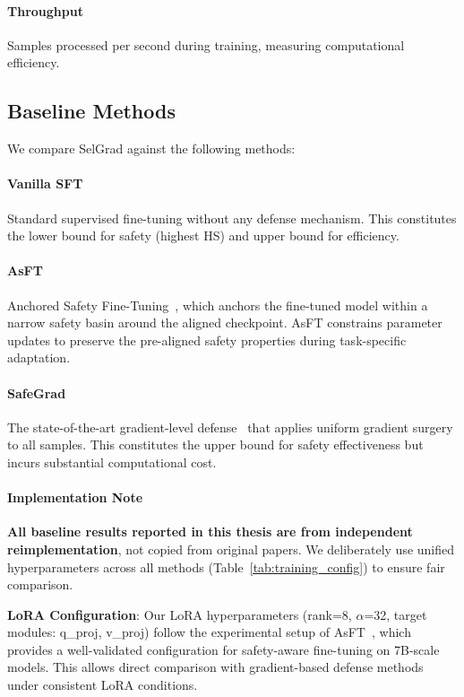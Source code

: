 \paragraph{Throughput}
Samples processed per second during training, measuring computational efficiency.

\subsection{Baseline Methods}
\label{subsec:baselines}

We compare SelGrad against the following methods:

\paragraph{Vanilla SFT}
Standard supervised fine-tuning without any defense mechanism. This constitutes the lower bound for safety (highest HS) and upper bound for efficiency.

\paragraph{AsFT}
Anchored Safety Fine-Tuning~\cite{huang2024asft}, which anchors the fine-tuned model within a narrow safety basin around the aligned checkpoint. AsFT constrains parameter updates to preserve the pre-aligned safety properties during task-specific adaptation.

\paragraph{SafeGrad}
The state-of-the-art gradient-level defense~\cite{yi2025safegrad} that applies uniform gradient surgery to all samples. This constitutes the upper bound for safety effectiveness but incurs substantial computational cost.

\paragraph{Implementation Note}
\textbf{All baseline results reported in this thesis are from independent reimplementation}, not copied from original papers. We deliberately use unified hyperparameters across all methods (Table~\ref{tab:training_config}) to ensure fair comparison.

\textbf{LoRA Configuration}: Our LoRA hyperparameters (rank=8, $\alpha$=32, target modules: q\_proj, v\_proj) follow the experimental setup of AsFT~\cite{huang2024asft}, which provides a well-validated configuration for safety-aware fine-tuning on 7B-scale models. This allows direct comparison with gradient-based defense methods under consistent LoRA conditions.

